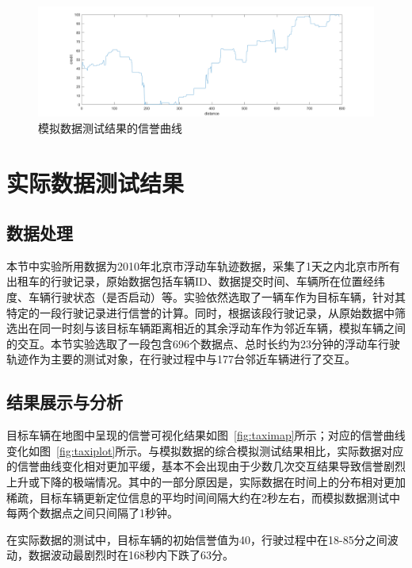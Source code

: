 \begin{figure}
  \centering
  \includegraphics[width=1\linewidth]{figures/mapplot4.png}
  \caption{模拟数据测试结果的信誉曲线}
  \label{fig:simplot}
\end{figure}

\section{实际数据测试结果}

\subsection{数据处理}
本节中实验所用数据为2010年北京市浮动车轨迹数据，采集了1天之内北京市所有出租车的行驶记录，原始数据包括车辆ID、数据提交时间、车辆所在位置经纬度、车辆行驶状态（是否启动）等。实验依然选取了一辆车作为目标车辆，针对其特定的一段行驶记录进行信誉的计算。同时，根据该段行驶记录，从原始数据中筛选出在同一时刻与该目标车辆距离相近的其余浮动车作为邻近车辆，模拟车辆之间的交互。本节实验选取了一段包含696个数据点、总时长约为23分钟的浮动车行驶轨迹作为主要的测试对象，在行驶过程中与177台邻近车辆进行了交互。

\subsection{结果展示与分析}
目标车辆在地图中呈现的信誉可视化结果如图~\ref{fig:taximap}所示；对应的信誉曲线变化如图~\ref{fig:taxiplot}所示。与模拟数据的综合模拟测试结果相比，实际数据对应的信誉曲线变化相对更加平缓，基本不会出现由于少数几次交互结果导致信誉剧烈上升或下降的极端情况。其中的一部分原因是，实际数据在时间上的分布相对更加稀疏，目标车辆更新定位信息的平均时间间隔大约在2秒左右，而模拟数据测试中每两个数据点之间只间隔了1秒钟。

在实际数据的测试中，目标车辆的初始信誉值为40，行驶过程中在18-85分之间波动，数据波动最剧烈时在168秒内下跌了63分。

